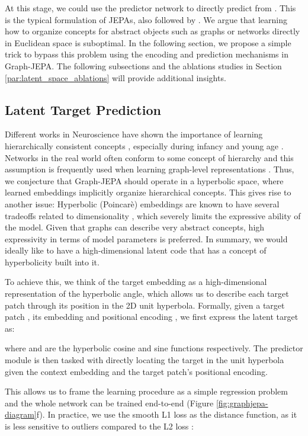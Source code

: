 \documentclass{article} \usepackage{iclr2024_conference,times}
\begin{document}
At this stage, we could use the predictor network to directly predict  from . This is the typical formulation of JEPAs, also followed by \citet{assran2023self}. We argue that learning how to organize concepts for abstract objects such as graphs or networks directly in Euclidean space is suboptimal. In the following section, we propose a simple trick to bypass this problem using the encoding and prediction mechanisms in Graph-JEPA. The following subsections and the ablations studies in Section \ref{par:latent_space_ablations} will provide additional insights.

\subsection{Latent Target Prediction} \label{met:latent_task}
Different works in Neuroscience have shown the importance of learning hierarchically consistent concepts \citep{Deco2021Revisiting}, especially during infancy and young age \citep{Rosenberg2013Infants}. Networks in the real world often conform to some concept of hierarchy \citep{moutsinas2021graph} and this assumption is frequently used when learning graph-level representations \citep{ying2018hierarchical}. Thus, we conjecture that Graph-JEPA should operate in a hyperbolic space, where learned embeddings implicitly organize hierarchical concepts\citep{nickel2017poincare,zhao2023modeling}. This gives rise to another issue: Hyperbolic (Poincarè) embeddings are known to have several tradeoffs related to dimensionality \citep{pmlr-v80-sala18a,guo2022co}, which severely limits the expressive ability of the model. Given that graphs can describe very abstract concepts, high expressivity in terms of model parameters is preferred. In summary, we would ideally like to have a high-dimensional latent code that has a concept of hyperbolicity built into it. 

To achieve this, we think of the target embedding as a high-dimensional representation of the hyperbolic angle, which allows us to describe each target patch through its position in the 2D unit hyperbola. Formally, given a target patch , its embedding  and positional encoding , we first express the latent target as:

where  and  are the hyperbolic cosine and sine functions respectively. The predictor module is then tasked with directly locating the target in the unit hyperbola given the context embedding and the target patch's positional encoding. 


This allows us to frame the learning procedure as a simple regression problem and the whole network can be trained end-to-end (Figure \ref{fig:graphjepa-diagram}f). In practice, we use the smooth L1 loss as the distance function, as it is less sensitive to outliers compared to the L2 loss \citep{girshick2015fast}:
\end{document}
